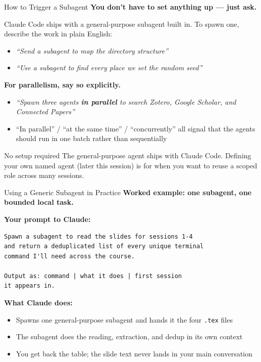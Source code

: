 \documentclass[aspectratio=169, 11pt]{beamer}
\begin{document}
\begin{frame}{How to Trigger a Subagent}
  \textbf{You don't have to set anything up --- just ask.}

  \vspace{0.6em}
  Claude Code ships with a general-purpose subagent built in. To spawn one, describe the work in plain English:
  \begin{itemize}
    \item \textit{``Send a subagent to map the directory structure''}
    \item \textit{``Use a subagent to find every place we set the random seed''}
  \end{itemize}

  \vspace{0.6em}
  \textbf{For parallelism, say so explicitly.}
  \begin{itemize}
    \item \textit{``Spawn three agents \textbf{in parallel} to search Zotero, Google Scholar, and Connected Papers''}
    \item ``In parallel'' / ``at the same time'' / ``concurrently'' all signal that the agents should run in one batch rather than sequentially
  \end{itemize}

  \vspace{0.6em}
  \begin{block}{No setup required}
    The general-purpose agent ships with Claude Code. Defining your own named agent (later this session) is for when you want to reuse a scoped role across many sessions.
  \end{block}
\end{frame}

\begin{frame}[fragile]{Using a Generic Subagent in Practice}
  \textbf{Worked example: one subagent, one bounded local task.}

  \vspace{0.3em}
  \textbf{Your prompt to Claude:}
  \begin{lstlisting}[basicstyle=\ttfamily\scriptsize]
Spawn a subagent to read the slides for sessions 1-4
and return a deduplicated list of every unique terminal
command I'll need across the course.

Output as: command | what it does | first session
it appears in.
  \end{lstlisting}

  \vspace{0.2em}
  \textbf{What Claude does:}
  \begin{itemize}\small
    \item Spawns one general-purpose subagent and hands it the four \texttt{.tex} files
    \item The subagent does the reading, extraction, and dedup in its own context
    \item You get back the table; the slide text never lands in your main conversation
  \end{itemize}

  \vspace{0.2em}
\end{frame}
\end{document}
